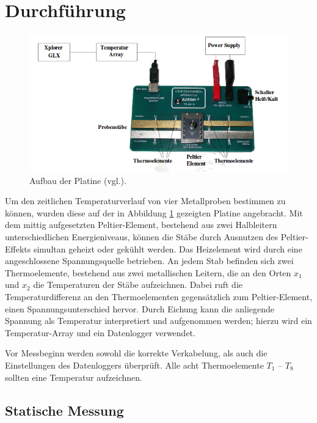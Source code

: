 \newpage
\section{Durchführung}
\label{sec:Durchfuehrung}
\begin{figure}
	\centering
	\includegraphics[width=\textwidth]{Bilder/Aufbau.png}
	\caption{Aufbau der Platine (vgl.\cite{V204}).}
\label{fig:platine}
\end{figure}
Um den zeitlichen Temperaturverlauf von vier Metallproben bestimmen zu können, wurden diese auf der in Abbildung \ref{fig:platine} gezeigten Platine angebracht. 
Mit dem mittig aufgesetzten Peltier-Element, bestehend aus zwei Halbleitern unterschiedlichen Energieniveaus, können die Stäbe durch Ausnutzen des Peltier-Effekts simultan geheizt oder gekühlt werden. 
Das Heizelement wird durch eine angeschlossene Spannungsquelle betrieben. 
An jedem Stab befinden sich zwei Thermoelemente, bestehend aus zwei metallischen Leitern, die an den Orten $x_1$ und $x_2$ die Temperaturen der Stäbe aufzeichnen. 
Dabei ruft die Temperaturdifferenz an den Thermoelementen gegensätzlich zum Peltier-Element, einen Spannungsunterschied hervor.
Durch Eichung kann die anliegende Spannung als Temperatur interpretiert und aufgenommen werden; hierzu wird ein Temperatur-Array und ein 
Datenlogger verwendet.

Vor Messbeginn werden sowohl die korrekte Verkabelung, als auch die Einstellungen des Datenloggers überprüft.
Alle acht Thermoelemente $T_\mathup{1}$ -- $T_\mathup{8}$ sollten eine Temperatur aufzeichnen.

\subsection{Statische Messung}

